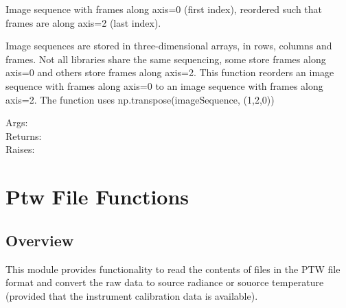 \documentclass[a4paper,10pt,english]{sphinxmanual}
\begin{document}
\begin{fulllineitems}
\label{ryutils:pyradi.ryutils.framesLast}
Image sequence with frames along axis=0 (first index), reordered such that 
frames are along axis=2 (last index).

Image sequences are stored in three-dimensional arrays, in rows, columns and frames.
Not all libraries share the same sequencing, some store frames along axis=0 and 
others store frames along axis=2.  This function reorders an image sequence with 
frames along axis=0  to an image sequence with frames along axis=2.  The function
uses np.transpose(imageSequence, (1,2,0))
\begin{description}
\item[{Args:}] \leavevmode
{}

\item[{Returns:}] \leavevmode
{}

\item[{Raises:}] \leavevmode
{}

\end{description}

\end{fulllineitems}



\chapter{Ptw  File Functions}
\label{ryptw:ptw-file-functions}\label{ryptw::doc}

\section{Overview}
\label{ryptw:module-pyradi.ryptw}\label{ryptw:overview}
This module provides functionality to read the contents of files in the
PTW file format and convert the raw data to source radiance or souorce
temperature (provided that the instrument calibration data is available).
\end{document}
